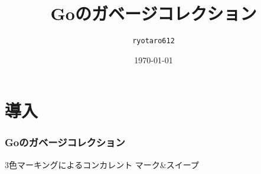 \documentclass[unicode, 14pt, aspectratio=169]{beamer}
\date{\today}
\title{Goのガベージコレクション}
\author{\texttt{ryotaro612}}
\begin{document}
\begin{frame}
\titlepage
\end{frame}
\section{導入}
\begin{frame}[t]
  \frametitle{Goのガベージコレクション}
  {\large 3色マーキングによるコンカレント マーク\&スイープ}
\end{frame}

\end{document}
